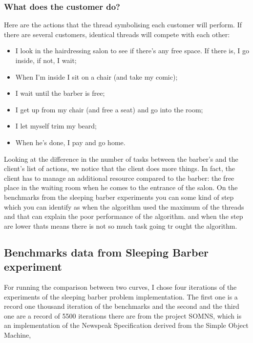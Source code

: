 \documentclass{article}
\begin{document}
\subsubsection{ What does the customer do?}

Here are the actions that the thread symbolising each customer will perform. If there are several customers, identical threads will compete with each other:

\begin{itemize}
    \item I look in the hairdressing salon to see if there's any free space. If there is, I go inside, if not, I wait;
    \item When I'm inside I sit on a chair (and take my comic);
    \item I wait until the barber is free;
    \item I get up from my chair (and free a seat) and go into the room;
    \item I let myself trim my beard;
    \item When he's done, I pay and go home.
\end{itemize}

Looking at the difference in the number of tasks between the barber's and the client's list of actions, we notice that the client does more things. In fact, the client has to manage an additional resource compared to the barber: the free place in the waiting room when he comes to the entrance of the salon. On the benchmarks from the sleeping barber experiments you can some kind of step which you can identify as when the algorithm used the maximum of the threads and that can explain the poor performance of the algorithm. and when the step are lower thats means there is not so much task going tr ought the algorithm.

\subsection{Benchmarks data from Sleeping Barber experiment}

For running the comparison between two curves, I chose four iterations of the experiments of the sleeping barber problem implementation. The first one is a record one thousand iteration of the benchmarks and the second and the third one are a record of 5500 iterations there are from the project SOMNS, which is an implementation of the Newspeak Specification derived from the Simple Object Machine,
\end{document}
